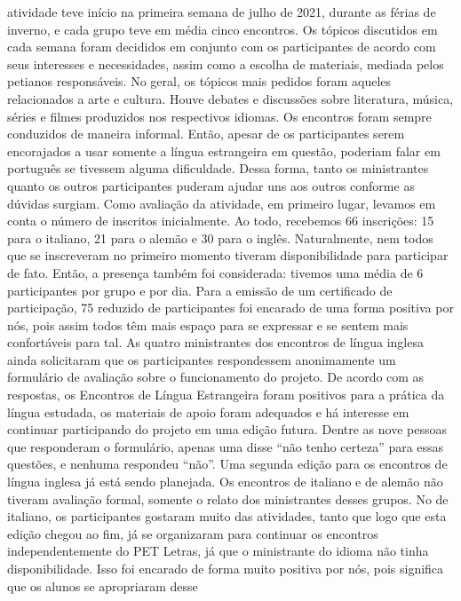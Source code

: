 atividade teve início na primeira semana de julho de 2021, durante as férias de inverno, e cada
grupo teve em média cinco encontros. Os tópicos discutidos em cada semana foram decididos
em conjunto com os participantes de acordo com seus interesses e necessidades, assim como a
escolha de materiais, mediada pelos petianos responsáveis.
No geral, os tópicos mais pedidos foram aqueles relacionados a arte e cultura. Houve debates
e discussões sobre literatura, música, séries e filmes produzidos nos respectivos idiomas. Os
encontros foram sempre conduzidos de maneira informal. Então, apesar de os participantes
serem encorajados a usar somente a língua estrangeira em questão, poderiam falar em português
se tivessem alguma dificuldade. Dessa forma, tanto os ministrantes quanto os outros
participantes puderam ajudar uns aos outros conforme as dúvidas surgiam.
Como avaliação da atividade, em primeiro lugar, levamos em conta o número de inscritos
inicialmente. Ao todo, recebemos 66 inscrições: 15 para o italiano, 21 para o alemão e 30 para o
inglês. Naturalmente, nem todos que se inscreveram no primeiro momento tiveram
disponibilidade para participar de fato. Então, a presença também foi considerada: tivemos uma
média de 6 participantes por grupo e por dia. Para a emissão de um certificado de participação,
75%
reduzido de participantes foi encarado de uma forma positiva por nós, pois assim todos têm mais
espaço para se expressar e se sentem mais confortáveis para tal.
As quatro ministrantes dos encontros de língua inglesa ainda solicitaram que os participantes
respondessem anonimamente um formulário de avaliação sobre o funcionamento do projeto. De
acordo com as respostas, os Encontros de Língua Estrangeira foram positivos para a prática da
língua estudada, os materiais de apoio foram adequados e há interesse em continuar participando
do projeto em uma edição futura. Dentre as nove pessoas que responderam o formulário, apenas
uma disse “não tenho certeza” para essas questões, e nenhuma respondeu “não”. Uma segunda
edição para os encontros de língua inglesa já está sendo planejada.
Os encontros de italiano e de alemão não tiveram avaliação formal, somente o relato dos
ministrantes desses grupos. No de italiano, os participantes gostaram muito das atividades, tanto
que logo que esta edição chegou ao fim, já se organizaram para continuar os encontros
independentemente do PET Letras, já que o ministrante do idioma não tinha disponibilidade. Isso
foi encarado de forma muito positiva por nós, pois significa que os alunos se apropriaram desse
